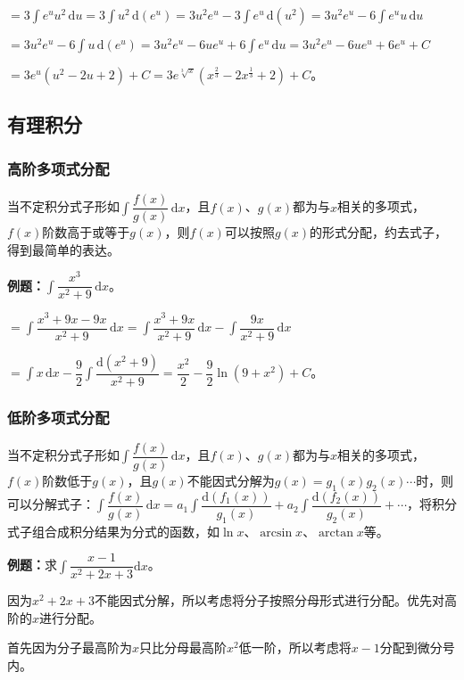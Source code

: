 \documentclass[UTF8, 12pt]{ctexart}
\begin{document}
$=3\int e^uu^2\,\textrm{d}u=3\int u^2\,\textrm{d}(e^u)=3u^2e^u-3\int e^u\,\textrm{d}(u^2)=3u^2e^u-6\int e^uu\,\textrm{d}u$

$=3u^2e^u-6\int u\,\textrm{d}(e^u)=3u^2e^u-6ue^u+6\int e^u\,\textrm{d}u=3u^2e^u-6ue^u+6e^u+C$

$=3e^u(u^2-2u+2)+C=3e^{\sqrt[3]{x}}(x^{\frac{2}{3}}-2x^{\frac{1}{3}}+2)+C$。

\subsection{有理积分}

\subsubsection{高阶多项式分配}

当不定积分式子形如$\displaystyle{\int\dfrac{f(x)}{g(x)}\,\textrm{d}x}$，且$f(x)$、$g(x)$都为与$x$相关的多项式，$f(x)$阶数高于或等于$g(x)$，则$f(x)$可以按照$g(x)$的形式分配，约去式子，得到最简单的表达。

\textbf{例题：}$\displaystyle{\int\dfrac{x^3}{x^2+9}\,\textrm{d}x}$。 \medskip

$=\displaystyle{\int\dfrac{x^3+9x-9x}{x^2+9}\,\textrm{d}x=\int\dfrac{x^3+9x}{x^2+9}\,\textrm{d}x-\int\dfrac{9x}{x^2+9}\,\textrm{d}x}$ \medskip

$\displaystyle{=\int x\,\textrm{d}x-\dfrac{9}{2}\int\dfrac{\textrm{d}(x^2+9)}{x^2+9}}=\dfrac{x^2}{2}-\dfrac{9}{2}\ln(9+x^2)+C$。

\subsubsection{低阶多项式分配}

当不定积分式子形如$\displaystyle{\int\dfrac{f(x)}{g(x)}\,\textrm{d}x}$，且$f(x)$、$g(x)$都为与$x$相关的多项式，$f(x)$阶数低于$g(x)$，且$g(x)$不能因式分解为$g(x)=g_1(x)g_2(x)\cdots$时，则可以分解式子：$\displaystyle{\int\dfrac{f(x)}{g(x)}\,\textrm{d}x=a_1\int\dfrac{\textrm{d}(f_1(x))}{g_1(x)}+a_2\int\dfrac{\textrm{d}(f_2(x))}{g_2(x)}}+\cdots$，将积分式子组合成积分结果为分式的函数，如$\ln x$、$\arcsin x$、$\arctan x$等。

\textbf{例题：}求$\displaystyle{\int\dfrac{x-1}{x^2+2x+3}\textrm{d}x}$。

因为$x^2+2x+3$不能因式分解，所以考虑将分子按照分母形式进行分配。优先对高阶的$x$进行分配。

首先因为分子最高阶为$x$只比分母最高阶$x^2$低一阶，所以考虑将$x-1$分配到微分号内。
\end{document}
